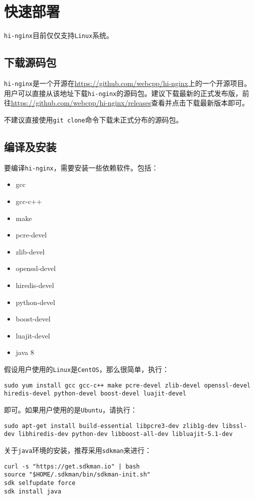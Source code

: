 \section{快速部署}
\texttt{hi-nginx}目前仅仅支持\texttt{Linux}系统。

\subsection{下载源码包}
\texttt{hi-nginx}是一个开源在\url{https://github.com/webcpp/hi-nginx}上的一个开源项目。用户可以直接从该地址下载\texttt{hi-nginx}的源码包。建议下载最新的正式发布版，前往\url{https://github.com/webcpp/hi-nginx/releases}查看并点击下载最新版本即可。

不建议直接使用\texttt{git clone}命令下载未正式分布的源码包。

\subsection{编译及安装}
要编译\texttt{hi-nginx}，需要安装一些依赖软件。包括：
\begin{itemize}
\item gcc
\item gcc-c++
\item make
\item pcre-devel
\item zlib-devel
\item openssl-devel
\item hiredis-devel
\item python-devel
\item boost-devel
\item luajit-devel
\item java 8
\end{itemize}
假设用户使用的\texttt{Linux}是\texttt{CentOS}，那么很简单，执行：
\begin{lstlisting}
sudo yum install gcc gcc-c++ make pcre-devel zlib-devel openssl-devel hiredis-devel python-devel boost-devel luajit-devel
\end{lstlisting}
即可。如果用户使用的是\texttt{Ubuntu}，请执行：
\begin{lstlisting}
sudo apt-get install build-essential libpcre3-dev zlib1g-dev libssl-dev libhiredis-dev python-dev libboost-all-dev libluajit-5.1-dev 
\end{lstlisting}

关于\texttt{java}环境的安装，推荐采用\texttt{sdkman}来进行：
\begin{lstlisting}
curl -s "https://get.sdkman.io" | bash
source "$HOME/.sdkman/bin/sdkman-init.sh"
sdk selfupdate force
sdk install java
\end{lstlisting}

